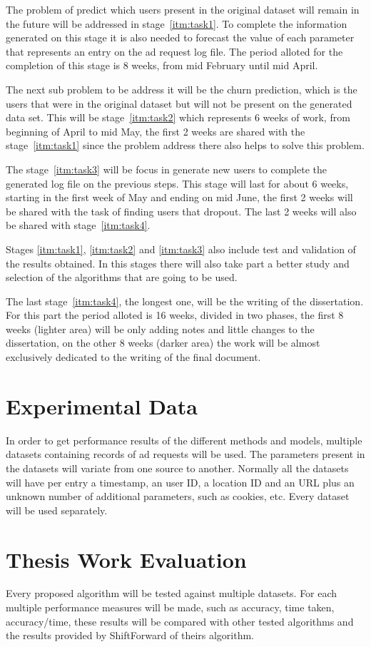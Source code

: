 The problem of predict which users present in the original dataset will remain
in the future will be addressed in stage~\ref{itm:task1}. To complete the
information generated on this stage it is also needed to forecast the value of
each parameter that represents an entry on the ad request log file. The period
alloted for the completion of this stage is 8 weeks, from mid February until mid
April.

The next sub problem to be address it will be the churn prediction, which is the
users that were in the original dataset but will not be present on the generated
data set. This will be stage~\ref{itm:task2} which represents 6 weeks of
work, from beginning of April to mid May,
the first 2 weeks are shared with the stage~\ref{itm:task1} since the problem
address there also helps to solve this problem.

The stage~\ref{itm:task3} will be focus in generate new users to complete the
generated log file on the previous steps. This stage will last for about 6
weeks, starting in the first week of May and ending on mid June, the first 2
weeks will be shared with the task of finding users that dropout. The last 2
weeks will also be shared with stage~\ref{itm:task4}.

Stages \ref{itm:task1}, \ref{itm:task2} and \ref{itm:task3} also include test
and validation of the results obtained. In this stages there will also take part
a better study and selection of the algorithms that are going to be used.

The last stage~\ref{itm:task4}, the longest one, will be the writing of the
dissertation. For this part the period alloted is 16 weeks, divided in two
phases, the first 8 weeks (lighter area) will be only adding notes and little changes to the
dissertation, on the other 8 weeks (darker area) the work will be almost exclusively dedicated
to the writing of the final document.


\section{Experimental Data}

In order to get performance results of the different methods and models,
multiple datasets containing records of ad requests will be used. The parameters
present in the datasets will variate from one source to another. Normally all
the datasets will have per entry a timestamp, an user ID, a location ID and an
URL plus an unknown number of additional parameters, such as cookies, etc.
Every dataset will be used separately.

\section{Thesis Work Evaluation}

Every proposed algorithm will be tested against multiple datasets. For each
multiple performance measures will be made, such as accuracy, time taken,
accuracy/time, these results will be compared with other tested algorithms and
the results provided by ShiftForward of theirs algorithm.
